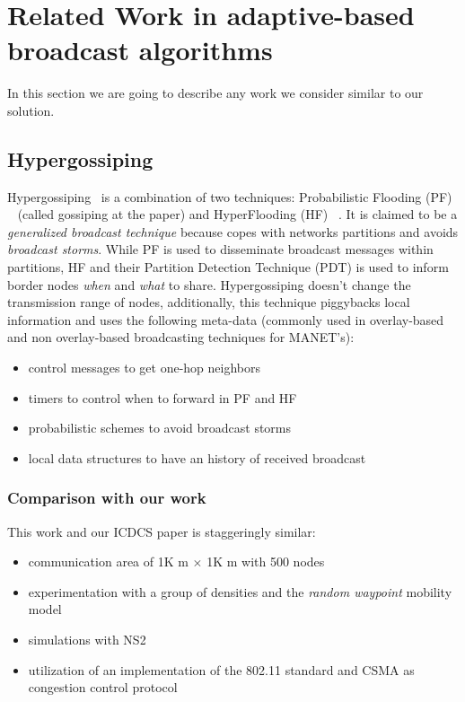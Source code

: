 
\section{Related Work in adaptive-based broadcast algorithms}
In this section we are going to describe any work we consider similar to our solution.

\subsection{Hypergossiping}
Hypergossiping~\cite{hypergossiping} is a combination of two techniques: Probabilistic Flooding (PF) ~\cite{BroadcastStormProblem} (called gossiping at the paper) and HyperFlooding (HF) ~\cite{FloodingDiscovery}.
%
It is claimed to be a \emph{generalized broadcast technique} because copes with networks partitions and avoids \emph{broadcast storms}\cite{BroadcastStormProblem}.
%
While PF is used to disseminate broadcast messages within partitions, HF and their Partition Detection Technique (PDT) is used to inform border nodes \emph{when} and \emph{what} to share.
%
Hypergossiping doesn't change the transmission range of nodes, additionally, this technique piggybacks local information and uses the following meta-data (commonly used in overlay-based and non overlay-based broadcasting techniques for MANET's):

\begin{itemize}
	\item control messages to get one-hop neighbors
	\item timers to control when to forward in PF and HF
	\item probabilistic schemes to avoid broadcast storms
	\item local data structures to have an history of received broadcast
\end{itemize}



\subsubsection{Comparison with our work}
This work and our ICDCS paper is staggeringly similar:
\begin{itemize}
	\item communication area of 1K m $\times$ 1K m with 500 nodes
	\item experimentation with a group of densities and the \emph{random waypoint} mobility model
	\item simulations with NS2
	\item utilization of an implementation of the 802.11 standard and CSMA as congestion control protocol
\end{itemize}



